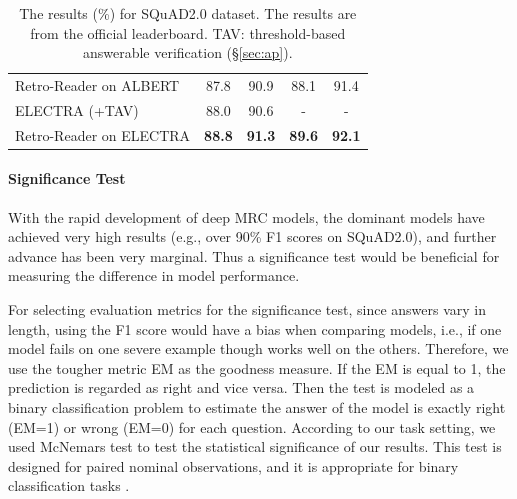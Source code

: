 \documentclass[letterpaper]{article} %
\begin{document}
\begin{table}
{\begin{tabular}{l c c c c }
			Retro-Reader on ALBERT & 87.8 & 90.9 & 88.1 & 91.4 \\
			ELECTRA (+TAV) & 88.0 & 90.6  & -  & - \\
			Retro-Reader on ELECTRA & \textbf{88.8} & \textbf{91.3} & \textbf{89.6} & \textbf{92.1} \\
			\bottomrule
		\end{tabular}
	}
	\caption{\label{tab:squad2.0} The results (\%) for SQuAD2.0 dataset. The results  are from the official leaderboard.
	TAV: threshold-based answerable verification (\S\ref{sec:ap}).
	}
\end{table}

\paragraph{Significance Test} With the rapid development of deep MRC models, the dominant models have achieved very high results (e.g., over 90\% F1 scores on SQuAD2.0), and further advance has been very marginal. %
Thus a significance test would be beneficial for measuring the difference in model performance. %

For selecting evaluation metrics for the significance test, since answers vary in length, using the F1 score would have a bias when comparing models, i.e., if one model fails on one severe example though works well on the others. Therefore, we use the tougher metric EM as the goodness measure. If the EM is equal to 1, the prediction is regarded as right and vice versa. Then the test is modeled as a binary classification problem to estimate the answer of the model is exactly right (EM=1) or wrong (EM=0) for each question. According to our task setting, we used McNemars test \cite{mcnemar1947note} to test the statistical significance of our results. This test is designed for paired nominal observations, and it is appropriate for binary classification tasks \cite{ziser2016neural}.

\end{document}
